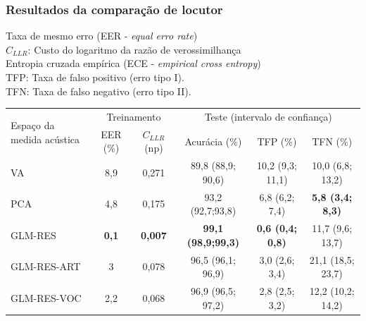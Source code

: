 \documentclass[121pt, aspectratio=169, t]{beamer}
\begin{document}
\begin{frame}[fragile=singleslide]
	\frametitle{Resultados da comparação de locutor}
	Taxa de mesmo erro (EER - \textit{equal erro rate})\\
	$C_{LLR}$: Custo do logaritmo da razão de verossimilhança\\
	Entropia cruzada empírica (ECE - \textit{empirical cross entropy})\\
	TFP: Taxa de falso positivo (erro tipo I).\\
	TFN: Taxa de falso negativo (erro tipo II).
	
	\begin{table}[]
		\small
		\begin{tabular}{@{}l|cc|ccc@{}}
			\toprule
			\multirow{2}{*}{Espaço da medida acústica} & \multicolumn{2}{c|}{Treinamento} & \multicolumn{3}{c}{Teste (intervalo de confiança)}                            \\ \cmidrule(l){2-6}
			& EER (\%)       & $C_{LLR}$ (np)       & Acurácia (\%)             & TFP (\%)                & TFN (\%)                \\ \midrule
			VA                                         & 8,9            & 0,271           & 89,8 (88,9; 90,6)         & 10,2 (9,3; 11,1)        & 10,0 (6,8; 13,2)        \\
			PCA                                        & 4,8            & 0,175           & 93,2 (92,7;93,8)          & 6,8 (6,2; 7,4)          & \textbf{5,8 (3,4; 8,3)} \\
			GLM-RES                                    & \textbf{0,1}   & \textbf{0,007}  & \textbf{99,1 (98,9;99,3)} & \textbf{0,6 (0,4; 0,8)} & 11,7 (9,6; 13,7)        \\
			GLM-RES-ART                                & 3              & 0,078           & 96,5 (96,1; 96,9)         & 3,0 (2,6; 3,4)          & 21,1 (18,5; 23,7)       \\
			GLM-RES-VOC                                & 2,2            & 0,068           & 96,9 (96,5; 97,2)         & 2,8 (2,5; 3,2)          & 12,2 (10,2; 14,2)       \\ \bottomrule
		\end{tabular}
	\end{table}
\end{frame}
\end{document}
